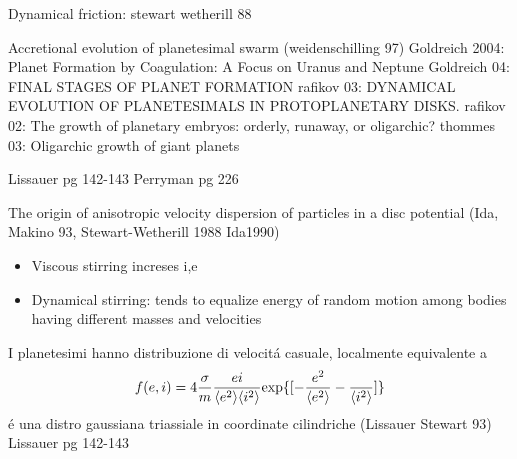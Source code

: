 \begin{workout}
Dynamical friction: stewart wetherill 88
\end{workout}

\begin{workout}
Accretional evolution of planetesimal swarm (weidenschilling 97)
Goldreich 2004: Planet Formation by Coagulation: A Focus on Uranus and Neptune
Goldreich 04: FINAL STAGES OF PLANET FORMATION
rafikov 03: DYNAMICAL EVOLUTION OF PLANETESIMALS IN PROTOPLANETARY DISKS.
rafikov 02: The growth of planetary embryos: orderly, runaway, or oligarchic?
thommes 03: Oligarchic growth of giant planets
\end{workout}

\begin{workout}[10m-10km, 100km-1000km, 1000km-10000km: refs]
Lissauer pg 142-143
Perryman pg 226
\end{workout}

\begin{workout}
The origin of anisotropic velocity dispersion of particles in a disc potential (Ida, Makino 93, Stewart-Wetherill 1988 Ida1990)
\end{workout}

\begin{workout}
\begin{itemize}
\item Viscous stirring increses i,e
\item Dynamical stirring: tends to equalize energy of random motion among bodies having different masses and velocities
\end{itemize}
\end{workout}

\begin{workout}
I planetesimi hanno distribuzione di velocit\'a casuale, localmente equivalente a
\begin{equation}
f(e,i)=4\frac{\sigma}{m}\frac{ei}{\langle e^2 \rangle\langle i^2 \rangle}\text{exp}\{[-\frac{e^2}{\langle e^2 \rangle}-\frac{}{\langle i^2 \rangle}]\}
\end{equation}
\'e una distro gaussiana triassiale in coordinate cilindriche (Lissauer Stewart 93)
Lissauer pg 142-143
\end{workout}

